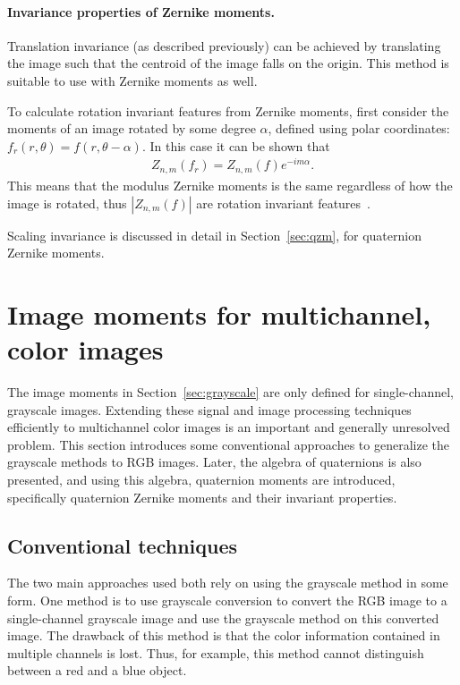 \paragraph{Invariance properties of Zernike moments.} Translation invariance (as described previously) can be achieved by translating the image such that the centroid of the image falls on the origin. This method is suitable to use with Zernike moments as well.


To calculate rotation invariant features from Zernike moments, first consider the moments of an image rotated by some degree $\alpha$, defined using polar coordinates: $f_{r}(r,\theta) = f(r,\theta - \alpha)$. In this case it can be shown that
\begin{gather*}
    Z_{n,m}(f_r) =  Z_{n,m}(f) e^{-i m\alpha}.
\end{gather*}
This means that the modulus Zernike moments is the same regardless of how the image is rotated, thus $|Z_{n,m}(f)|$ are rotation invariant features~\cite{zernike_moments}.


Scaling invariance is discussed in detail in Section~\ref{sec:qzm}, for quaternion Zernike moments.

\section{Image moments for multichannel, color images}
The image moments in Section~\ref{sec:grayscale} are only defined for single-channel, grayscale images. Extending these signal and image processing techniques efficiently to multichannel color images is an important and generally unresolved problem. This section introduces some conventional approaches to generalize the grayscale methods to RGB images. Later, the algebra of quaternions is also presented, and using this algebra, quaternion moments are introduced, specifically quaternion Zernike moments and their invariant properties.  

\subsection{Conventional techniques}
The two main approaches used both rely on using the grayscale method in some form. One method is to use grayscale conversion to convert the RGB image to a single-channel grayscale image and use the grayscale method on this converted image. The drawback of this method is that the color information contained in multiple channels is lost. Thus, for example, this method cannot distinguish between a red and a blue object.

